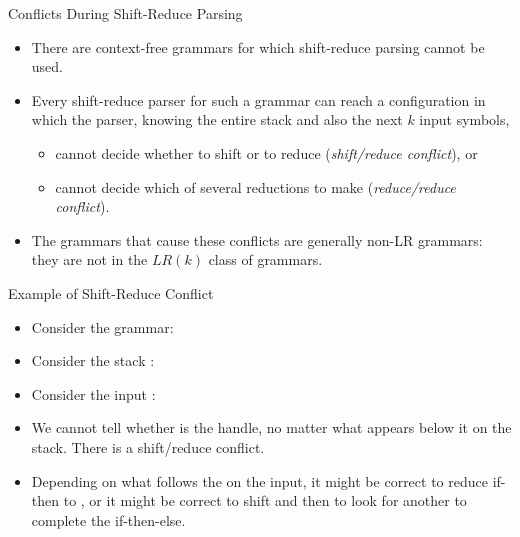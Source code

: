 \begin{bibunit}[apalike]
\begin{frame}{Conflicts During Shift-Reduce Parsing}
	\begin{itemize}
	\item There are context-free grammars for which shift-reduce parsing cannot be used.
	\vfill
	\item Every shift-reduce parser for such a grammar can reach a configuration in which the parser, knowing the entire stack and also the next $k$ input symbols,
		\begin{itemize}
		\item cannot decide whether to shift or to reduce (\emph{shift/reduce conflict}), or
		\item cannot decide which of several reductions to make (\emph{reduce/reduce conflict}).
		\end{itemize}
	\vfill
	\item The grammars that cause these conflicts are generally non-LR grammars: they are not in the $LR(k)$ class of grammars.
	\end{itemize}
\end{frame}

\begin{frame}{Example of Shift-Reduce Conflict}	
	\begin{itemize}
	\item Consider the grammar: \\
		\begin{footnotesize}\begin{bnf}
		\end{bnf}\end{footnotesize}
	\item Consider the stack : 
	\item Consider the input : 
	\vfill
	\item We cannot tell whether  is the handle, no matter what appears below it on the stack. There is a shift/reduce conflict.
	\item Depending on what follows the  on the input, it might be correct to reduce if-then to , or it might be correct to shift  and then to look for another  to complete the if-then-else.
	\end{itemize}
\end{frame}


\end{bibunit}

